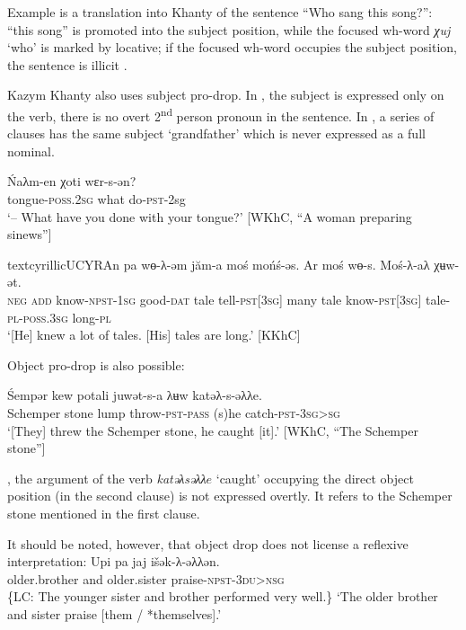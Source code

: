 \documentclass[output=paper]{langscibook}
\begin{document}
Example  is a translation into Khanty of the sentence “Who sang this song?”: “this song” is promoted into the subject position, while the focused wh-word \textit{χuj} ‘who’ is marked by locative; if the focused wh-word occupies the subject position, the sentence is illicit .

Kazym Khanty also uses subject pro-drop. In , the subject is expressed only on the verb, there is no overt 2\textsuperscript{nd} person pronoun in the sentence. In , a series of clauses has the same subject ‘grandfather’ which is never expressed as a full nominal. %

\ea 
\label{ex:Volkova:12}
 \gll Ńaλm-en χoti wɛr-s-ən?\\
 tongue\textsc{{}-poss.2sg} what do\textsc{{}-pst-}2sg\\
 \glt ‘– What have you done with your tongue?’ [WKhC, “A woman preparing sinews”]
\z

 \ea 
\label{ex:Volkova:13}
 \gll textcyrillic{{UCYRA}n} pa wɵ-λ{}-əm jăm{}-a moś mońś-əs. Ar moś wɵ-s.  Moś-λ-aλ χʉw-ət.\\
 \textsc{neg} \textsc{add} know\textsc{{}-npst-1sg} good\textsc{{}-dat} tale tell\textsc{{}-pst[3sg]} many tale know\textsc{{}-pst[3sg]} tale-\textsc{pl-poss.3sg} long\textsc{{}-pl}\\
 \glt ‘[He] knew a lot of tales. [His] tales are long.’ [KKhC]
\z
 


Object pro-drop is also possible: 


 \ea 
\label{ex:Volkova:14}
 \gll Śempər kew potali juwət-s-a λʉw katəλ-s-əλλe.\\
 Schemper stone lump throw\textsc{{}-pst-pass} (s)he catch\textsc{{}-pst-}\textsc{3sg>s}\textsc{g}\\
 \glt ‘[They] threw the Schemper stone, he caught [it].’ [WKhC, “The Schemper stone”]
\z



%
, the argument of the verb \textit{katəλsəλ}\textit{λ}\textit{$e$} ‘caught’ occupying the direct object position (in the second clause) is not expressed overtly. It refers to the Schemper stone mentioned in the first clause.

It should be noted, however, that object drop does not license a reflexive interpretation:
\ea 
\label{ex:Volkova:15}
 \gll Upi pa jaj išək-λ-əλλən. \\
 older.brother and older.sister praise\textsc{{}-npst-3du>nsg}\\
 \glt \{LC: The younger sister and brother performed very well.\} ‘The older brother and sister praise [them / *themselves].’
\z
\end{document}
